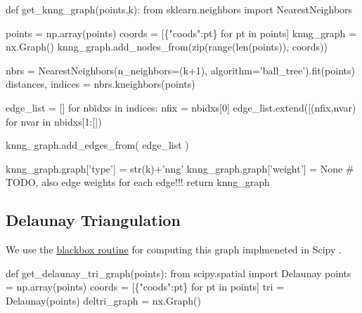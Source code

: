 \nwenddocs{}\endmoddef\nwstartdeflinemarkup{}\nwenddeflinemarkup

def get_knng_graph(points,k):
     from sklearn.neighbors import NearestNeighbors

     points     = np.array(points)
     coords     = [\{"coods":pt\} for pt in points]
     knng_graph = nx.Graph()
     knng_graph.add_nodes_from(zip(range(len(points)), coords))

     nbrs = NearestNeighbors(n_neighbors=(k+1), algorithm='ball_tree').fit(points)
     distances, indices = nbrs.kneighbors(points)

     edge_list = []
     for nbidxs in indices:
          nfix = nbidxs[0]
          edge_list.extend([(nfix,nvar) for nvar in nbidxs[1:]])

     knng_graph.add_edges_from(  edge_list  )

     knng_graph.graph['type']   = str(k)+'nng'
     knng_graph.graph['weight'] =  None # TODO, also edge weights for each edge!!!
     return knng_graph
\nwendcode{}\nwdocspar


\subsection{Delaunay Triangulation}

We use the  \href{https://docs.scipy.org/doc/scipy/reference/generated/scipy.spatial.Delaunay.html}{blackbox routine} 
for computing this graph implmeneted in Scipy \cite{virtanen2020scipy}. 

\nwenddocs{}\plusendmoddef\nwstartdeflinemarkup{}\nwenddeflinemarkup
def get_delaunay_tri_graph(points):
     from scipy.spatial import Delaunay
     points       = np.array(points)
     coords       = [\{"coods":pt\} for pt in points]
     tri          = Delaunay(points)
     deltri_graph = nx.Graph()

